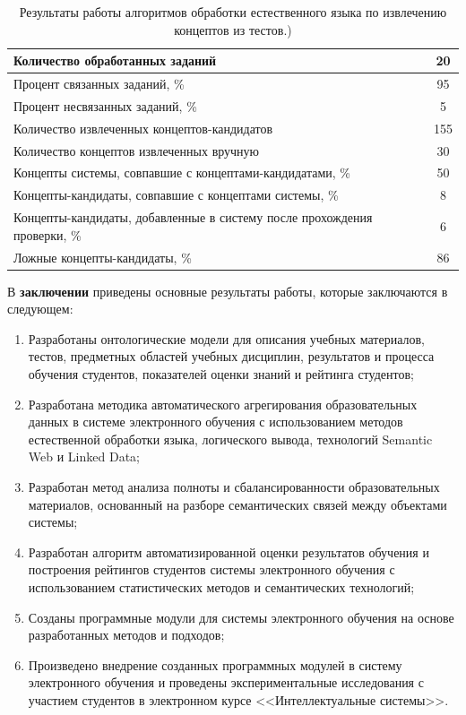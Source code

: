 \begin{table}[h!]
\centering
\caption{Результаты работы алгоритмов обработки естественного языка по извлечению концептов из тестов.)}
\label{table:2}
\begin{tabular}{ |p{12cm}|c|  }
\hline Количество обработанных заданий & 20 \\
\hline Процент связанных заданий, \% & 95 \\
\hline Процент несвязанных заданий, \% & 5 \\
\hline Количество извлеченных концептов-кандидатов & 155 \\
\hline Количество концептов извлеченных вручную & 30 \\
\hline Концепты системы, совпавшие с концептами-кандидатами, \% & 50 \\
\hline Концепты-кандидаты, совпавшие с концептами системы, \% & 8 \\
\hline Концепты-кандидаты, добавленные в систему после прохождения проверки, \%  & 6 \\
\hline Ложные концепты-кандидаты, \% & 86 \\
\hline
\end{tabular}
\end{table}  


В \textbf{заключении} приведены основные результаты работы, которые заключаются в следующем:
\begin{enumerate}
 \item Разработаны онтологические модели для описания учебных материалов, тестов, предметных областей учебных дисциплин, результатов и процесса обучения студентов, показателей оценки знаний и рейтинга студентов;
 \item Разработана методика автоматического агрегирования образовательных данных в системе электронного обучения с использованием методов естественной обработки языка, логического вывода, технологий Semantic Web и Linked Data;
 \item Разработан метод анализа полноты и сбалансированности образовательных материалов, основанный на разборе семантических связей между объектами системы;
  \item Разработан алгоритм автоматизированной оценки результатов обучения и построения рейтингов студентов системы электронного обучения с использованием статистических методов и семантических технологий;
  \item Созданы программные модули для системы электронного обучения на основе разработанных методов и подходов;
  \item Произведено внедрение созданных программных модулей в систему электронного обучения и проведены экспериментальные исследования с участием студентов в электронном курсе <<Интеллектуальные системы>>.
  \end{enumerate}


\renewcommand{\refname}{Научные работы по теме диссертации}
\nocite{*}

